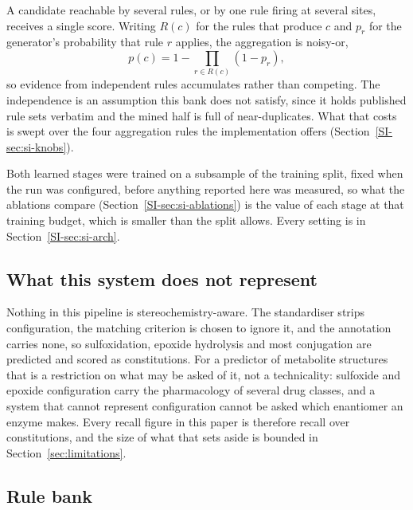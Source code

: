 A candidate reachable by several rules, or by one rule firing at several sites, receives a single
score. Writing $R(c)$ for the rules that produce $c$ and $p_r$ for the generator's probability
that rule $r$ applies, the aggregation is noisy-or,
\begin{equation}
p(c) = 1 - \prod_{r \in R(c)} \left( 1 - p_r \right),
\label{eq:noisyor}
\end{equation}
so evidence from independent rules accumulates rather than competing. The independence is an
assumption this bank does not satisfy, since it holds published rule sets verbatim and the mined
half is full of near-duplicates. What that costs is swept over the four aggregation rules
the implementation offers (Section~\ref{SI-sec:si-knobs}).

Both learned stages were trained on a subsample of the training split, fixed when the run was configured, before anything reported here was measured, so what the ablations compare (Section~\ref{SI-sec:si-ablations}) is the value of each stage at that training budget, which is smaller than the split allows. Every setting is in Section~\ref{SI-sec:si-arch}.

\subsection{What this system does not represent}
\label{sec:methods-scope}

Nothing in this pipeline is stereochemistry-aware. The standardiser strips configuration, the
matching criterion is chosen to ignore it, and the annotation carries none, so sulfoxidation,
epoxide hydrolysis and most conjugation are predicted and scored as constitutions. For a predictor
of metabolite structures that is a restriction on what may be asked of it, not a
technicality: sulfoxide and epoxide configuration carry the pharmacology of several drug classes,
and a system that cannot represent configuration cannot be asked which enantiomer an enzyme makes.
Every recall figure in this paper is therefore recall over constitutions, and the size of what that
sets aside is bounded in Section~\ref{sec:limitations}.

\subsection{Rule bank}

